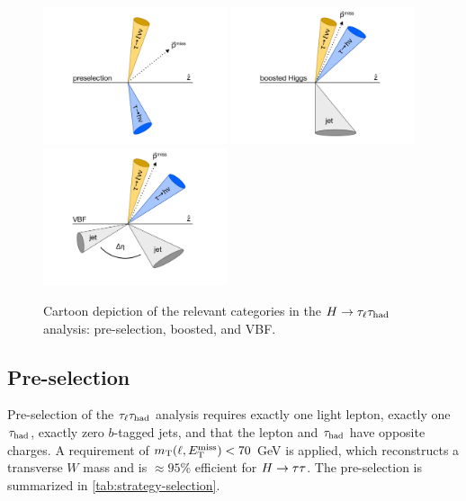 \begin{figure}[tp]
  \centering
  \includegraphics[width=0.48\textwidth]{figures/category-cartoons/presel}
  \includegraphics[width=0.48\textwidth]{figures/category-cartoons/boost}
  \includegraphics[width=0.48\textwidth]{figures/category-cartoons/vbf}
  \caption{Cartoon depiction of the relevant categories in the $H\rightarrow\tau_\ell\tau_\text{had}$ analysis: pre-selection, boosted, and VBF.}
  \label{fig:strategy-category-cartoons}
\end{figure}

\subsection{Pre-selection}
\label{sec:strategy-preselection}

Pre-selection of the $\tau_\ell\tau_\text{had}$ analysis requires exactly one light lepton, exactly one $\tau_\text{had}$, exactly zero $b$-tagged jets, and that the lepton and $\tau_\text{had}$ have opposite charges. A requirement of $m_\text{T}(\ell, E_{\mathrm{T}}^{\mathrm{miss}}) < 70$ GeV is applied, which reconstructs a transverse $W$ mass and is $\approx\!95$\% efficient for $H\rightarrow\tau\tau$. The pre-selection is summarized in \cref{tab:strategy-selection}.

